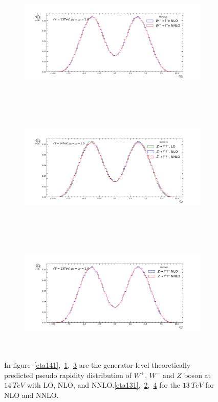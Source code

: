 \begin{figure}[H]
\begin{subfigure}{0.49\textwidth}
\caption{}
\label{eta142}
\end{subfigure}
\begin{subfigure}{0.49\textwidth}
\includegraphics[height=6cm, width=\textwidth]{chapter4/Wmeta_rf1_13.pdf}
\vspace*{-8mm}
\caption{}
\label{eta132}
\end{subfigure}
\begin{subfigure}{0.49\textwidth}
\includegraphics[height=6cm, width=\textwidth]{chapter4/Zeta_rf1_14.pdf}
\vspace*{-8mm}
\caption{}
\label{eta143}
\end{subfigure}
\begin{subfigure}{0.49\textwidth}
\includegraphics[height=6cm, width=\textwidth]{chapter4/Zeta_rf1_13.pdf}
\vspace*{-8mm}
\caption{}
\label{eta133}
\end{subfigure}
\caption{In figure~\ref{eta141},~\ref{eta142},~\ref{eta143} are the generator level theoretically predicted pseudo rapidity distribution of $W^{+}$, $W^{-}$ and $Z$ boson at $14~TeV$ with LO, NLO, and NNLO.\ref{eta131},~\ref{eta132},~\ref{eta133} for the $13~TeV$ for NLO and NNLO.}  
\label{dist2}
\end{figure}

